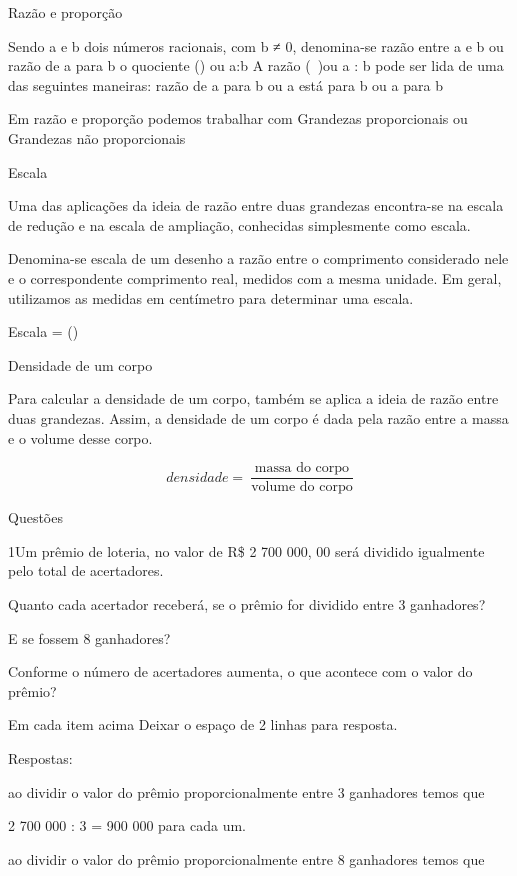 Razão e proporção

Sendo a e b dois números racionais, com b ≠ 0, denomina-se razão entre a
e b ou razão de a para b o quociente () ou a:b A razão
(\ )ou a : b pode ser lida de uma das seguintes maneiras:
razão de a para b ou a está para b ou a para b

Em razão e proporção podemos trabalhar com Grandezas proporcionais ou
Grandezas não proporcionais

Escala

Uma das aplicações da ideia de razão entre duas grandezas encontra-se na
escala de redução e na escala de ampliação, conhecidas simplesmente como
escala.

Denomina-se escala de um desenho a razão entre o comprimento considerado
nele e o correspondente comprimento real, medidos com a mesma unidade.
Em geral, utilizamos as medidas em centímetro para determinar uma
escala.

Escala =
()

Densidade de um corpo

Para calcular a densidade de um corpo, também se aplica a ideia de razão
entre duas grandezas. Assim, a densidade de um corpo é dada pela razão
entre a massa e o volume desse corpo.

\[densidade = \ \frac{\text{massa\ do\ corpo}}{\text{volume\ do\ corpo}}\]

Questões

\num{1}\times Um prêmio de loteria, no valor de R\$ 2 700 000, 00 será dividido
igualmente pelo total de acertadores.

\item Quanto cada acertador receberá, se o prêmio for dividido entre 3
ganhadores?

\item E se fossem 8 ganhadores?
\item Conforme o número de acertadores aumenta, o que acontece com o valor
do prêmio?

Em cada item acima Deixar o espaço de 2 linhas para resposta.

Respostas:

\item ao dividir o valor do prêmio proporcionalmente entre 3 ganhadores
temos que

2 700 000 : 3 = 900 000 para cada um.

\item ao dividir o valor do prêmio proporcionalmente entre 8 ganhadores
temos que

